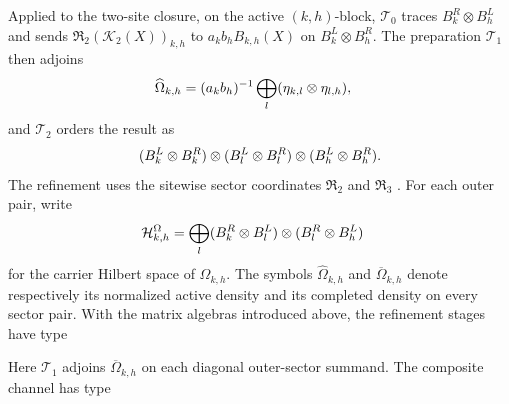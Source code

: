 Applied to the two-site closure, on the active $(k,h)$-block,
$\mathcal T_0$ traces $B_k^R\otimes B_h^L$ and sends
$\mathfrak R_2(\mathcal K_2(X))_{k,h}$ to
$a_kb_hB_{k,h}(X)$ on $B_k^L\otimes B_h^R$. The preparation
$\mathcal T_1$ then adjoins
\begin{align}
    \widehat\Omega_{k,h}
     & =(a_kb_h)^{-1}\bigoplus_l
    (\eta_{k,l}\otimes\eta_{l,h}),
    \notag
\end{align}
and $\mathcal T_2$ orders the result as
\begin{align}
    (B_k^L\otimes B_k^R)\otimes(B_l^L\otimes B_l^R)
    \otimes(B_h^L\otimes B_h^R).
    \notag
\end{align}
The refinement uses the sitewise sector coordinates $\mathfrak R_2$ and
$\mathfrak R_3$
\cite[Appendix~C.2, lines~1510--1516 and~1522--1545]
{Cirac2016MPDO_arXiv}.
For each outer pair, write
\begin{align}
    \mathcal H^{\Omega}_{k,h}
     & =\bigoplus_l
    (B_k^R\otimes B_l^L)\otimes(B_l^R\otimes B_h^L)
    \notag
\end{align}
for the carrier Hilbert space of $\Omega_{k,h}$. The symbols
$\widehat\Omega_{k,h}$ and $\overline\Omega_{k,h}$ denote respectively its
normalized active density and its completed density on every sector pair.
With the matrix algebras introduced above, the refinement stages have type

\par\noindent\hfil
{}
\hfil\par
Here $\mathcal T_1$ adjoins $\overline\Omega_{k,h}$ on each diagonal
outer-sector summand. The composite channel has type
\par\noindent\hfil
{}
\hfil\par

